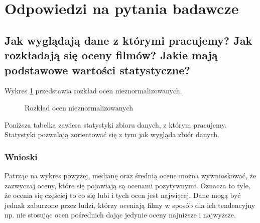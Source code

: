 \documentclass[12pt, a4paper]{article}
\begin{document}
\section{Odpowiedzi na pytania badawcze}

\subsection{Jak wyglądają dane z którymi pracujemy? Jak rozkładają się oceny filmów? Jakie mają podstawowe wartości statystyczne?}
Wykres \ref{fig:histogram-ocen-nieznorm} przedstawia rozkład ocen nieznormalizowanych. 

\begin{figure}[H]
  \begin{center}
  \end{center}
  \caption{Rozkład ocen nieznormalizowanych}
  \label{fig:histogram-ocen-nieznorm}
\end{figure}

Poniższa tabelka zawiera statystyki zbioru danych, z którym pracujemy. Statystyki pozwalają zorientować się z tym jak wygląda zbiór danych.


\subsubsection{Wnioski}
Patrząc na wykres powyżej, medianę oraz średnią ocene można wywnioskować, że zazwyczaj oceny, które się pojawiają są ocenami pozytywnymi. Oznacza to tyle, że ocenia się częściej to co się lubi i tych ocen jest najwięcej. Dane mogą być jednak zaburzone przez ludzi, którzy oceniają filmy w sposób dla ich tendencyjny np. nie stosując ocen pośrednich dając jedynie oceny najniższe i najwyższe.
\end{document}
